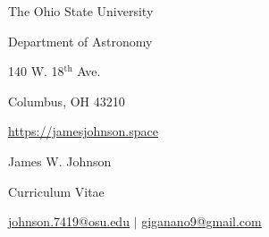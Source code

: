 \documentclass[cv.tex]{subfiles}
\begin{document}
\begin{center}
\parbox{.28\textwidth}{%
	\raggedleft%
	\vspace{-1.5cm}%
	The Ohio State University \par
	Department of Astronomy \par
	140 W. 18$^\text{th}$ Ave. \par
	Columbus, OH 43210 \par
	\url{https://jamesjohnson.space}%
}%
\hspace{4mm}%
\vrule height 2.0cm width 0.4pt%
\hspace{4mm}%
\parbox{0.5\textwidth}{%
	{%
	\vspace{-1.5cm}%
	\fontsize{30}{36} \selectfont James W. Johnson \par
	\fontsize{20}{25} \selectfont Curriculum Vitae \par
	\fontsize{11}{13} \selectfont%
	\vspace{0.08cm}%
	\href{mailto:johnson.7419@osu.edu}{johnson.7419@osu.edu}%
	\hspace{3mm}%
	$\vert$%
	\hspace{3mm}%
	\href{mailto:giganano9@gmail.com}{giganano9@gmail.com}%
	}%
}%
\end{center}
\end{document}
